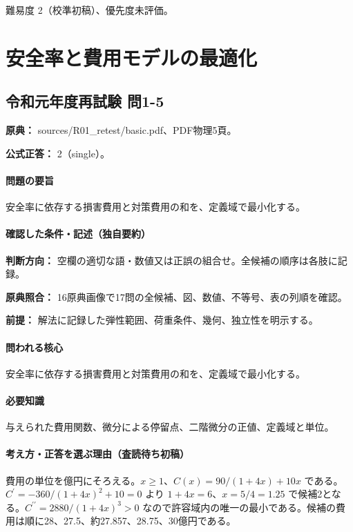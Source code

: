 \par 難易度 2（校準初稿）、優先度未評価。

\section{安全率と費用モデルの最適化}

\subsection{令和元年度再試験 問1-5}
\label{q:r01-ret-basic-1-5}

\noindent\textbf{原典：} sources/R01\_retest/basic.pdf、PDF物理5頁。

\textbf{公式正答：} 2（single）。

\paragraph{問題の要旨} 安全率に依存する損害費用と対策費用の和を、定義域で最小化する。

\paragraph{確認した条件・記述（独自要約）}\mbox{}\par

\noindent\textbf{判断方向：} 空欄の適切な語・数値又は正誤の組合せ。全候補の順序は各肢に記録。\par

\noindent\textbf{原典照合：} 16原典画像で17問の全候補、図、数値、不等号、表の列順を確認。\par

\noindent\textbf{前提：} 解法に記録した弾性範囲、荷重条件、幾何、独立性を明示する。\par

\paragraph{問われる核心} 安全率に依存する損害費用と対策費用の和を、定義域で最小化する。

\paragraph{必要知識} 与えられた費用関数、微分による停留点、二階微分の正値、定義域と単位。

\paragraph{考え方・正答を選ぶ理由（査読待ち初稿）} 費用の単位を億円にそろえる。\(x\ge1\)、\(C(x)=90/(1+4x)+10x\) である。\(C^\prime=-360/(1+4x)^2+10=0\) より \(1+4x=6\)、\(x=5/4=1.25\) で候補2となる。\(C^{\prime\prime}=2880/(1+4x)^3>0\) なので許容域内の唯一の最小である。候補の費用は順に28、27.5、約27.857、28.75、30億円である。

